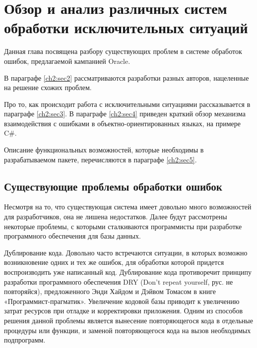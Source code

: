 \chapter{Обзор и анализ различных систем обработки исключительных ситуаций} \label{ch2}
	

Данная глава посвящена разбору существующих проблем в системе обработок ошибок, предлагаемой кампанией Oracle. 

В параграфе \ref{ch2:sec2} рассматриваются разработки разных авторов, нацеленные на решение схожих проблем. 

Про то, как происходит работа с исключительными ситуациями рассказывается в параграфе \ref{ch2:sec3}.
В параграфе \ref{ch2:sec4} приведен краткий обзор механизма взаимодействия с ошибками в объектно-ориентированных языках, на примере C\#.

Описание функциональных возможностей, которые необходимы в разрабатываемом пакете, перечисляются в параграфе \ref{ch2:sec5}.



\section{Существующие проблемы обработки ошибок}\label{ch2:sec1}
Несмотря на то, что существующая система имеет довольно много возможностей для разработчиков, она не лишена недостатков. Далее будут рассмотрены некоторые проблемы, с которыми сталкиваются программисты при разработке программного обеспечения для базы данных.

Дублирование кода. Довольно часто встречаются ситуации, в которых возможно возникновение одних и тех же ошибок, для обработки которой придется воспроизводить уже написанный код. Дублирование кода противоречит принципу разработки программного обеспечения DRY (Don’t repeat yourself, рус. не повторяйся), предложенного Энди Хайдом и Дэйвом Томасом в книге «Программист-прагматик»\cite{pragmatic}. Увеличение кодовой базы приводит к увеличению затрат ресурсов при отладке и корректировки приложения. Одним из способов решения данной проблемы является вынесение повторяющегося кода в отдельные процедуры или функции, и заменой повторяющегося кода на вызов необходимых подпрограмм. 

